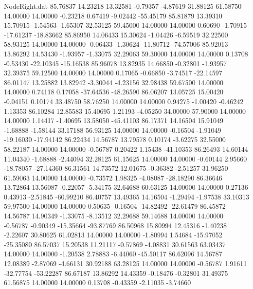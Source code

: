 \begin{filecontents}{NodeRight.dat}
  85.76837   14.23218   13.32581    -0.79357   -4.87619   31.88125   61.58750   14.00000   14.00000   -0.23218    0.67419   -9.02442  -55.45179
  85.81879   13.39310   15.70915    -1.54563   -1.65307   32.53125   59.45000   14.00000   14.00000    0.60690   -1.70915  -17.61237  -18.83662
  85.86950   14.06433   15.30624    -1.04426   -6.59519   32.22500   58.93125   14.00000   14.00000   -0.06433   -1.30624  -11.80712  -74.57006
  85.92013   13.86292   14.53430    -1.93957   -1.33075   32.29063   59.30000   14.00000   14.00000    0.13708   -0.53430  -22.10345  -15.16538
  85.96078   13.82935   14.66850    -0.32801   -1.93957   32.39375   59.12500   14.00000   14.00000    0.17065   -0.66850   -3.74517  -22.14597
  86.01147   13.25882   13.82942    -3.30044   -4.23156   32.98438   59.67500   14.00000   14.00000    0.74118    0.17058  -37.64536  -48.26590
  86.06207   13.05725   15.00420    -0.04151    0.10174   33.48750   58.76250   14.00000   14.00000    0.94275   -1.00420   -0.46242    1.13353
  86.10284   12.85583   15.40695     1.21193   -4.05250   34.00000   57.90000   14.00000   14.00000    1.14417   -1.40695   13.58050  -45.41103
  86.17371   14.16504   15.91049    -1.68888   -1.58144   33.17188   56.93125   14.00000   14.00000   -0.16504   -1.91049  -19.16030  -17.94142
  86.22434   14.56787   13.79578     0.10174   -3.62275   32.55000   58.22187   14.00000   14.00000   -0.56787    0.20422    1.15438  -41.10353
  86.26493   14.60144   11.04340    -1.68888   -2.44094   32.28125   61.15625   14.00000   14.00000   -0.60144    2.95660  -18.78057  -27.14360
  86.31561   14.73572   12.01675    -0.36382   -2.51257   31.96250   61.59063   14.00000   14.00000   -0.73572    1.98325   -4.08087  -28.18290
  86.36646   13.72864   13.56087    -0.22057   -5.34175   32.64688   60.63125   14.00000   14.00000    0.27136    0.43913   -2.51845  -60.99210
  86.40757   13.49365   14.16504    -1.29494   -1.97538   33.10313   59.97500   14.00000   14.00000    0.50635   -0.16504  -14.82492  -22.61479
  86.45872   14.56787   14.90349    -1.33075   -8.13512   32.29688   59.14688   14.00000   14.00000   -0.56787   -0.90349  -15.35664  -93.87769
  86.50968   15.80994   12.45316    -1.40238   -2.22607   30.80625   61.02813   14.00000   14.00000   -1.80994    1.54684  -15.97052  -25.35080
  86.57037   15.20538   11.21117    -0.57869   -4.08831   30.61563   63.03437   14.00000   14.00000   -1.20538    2.78883   -6.44060  -45.50117
  86.62096   14.56787   12.08389    -2.87069   -4.66131   30.92188   63.28125   14.00000   14.00000   -0.56787    1.91611  -32.77754  -53.22287
  86.67187   13.86292   14.43359    -0.18476   -0.32801   31.49375   61.56875   14.00000   14.00000    0.13708   -0.43359   -2.11035   -3.74660

\end{filecontents}
